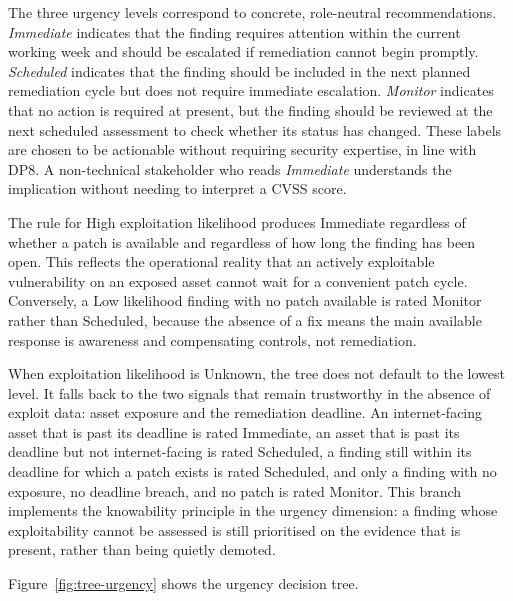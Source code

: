 The three urgency levels correspond to concrete, role-neutral recommendations. \textit{Immediate} indicates that the finding requires attention within the current working week and should be escalated if remediation cannot begin promptly. \textit{Scheduled} indicates that the finding should be included in the next planned remediation cycle but does not require immediate escalation. \textit{Monitor} indicates that no action is required at present, but the finding should be reviewed at the next scheduled assessment to check whether its status has changed. These labels are chosen to be actionable without requiring security expertise, in line with DP8. A non-technical stakeholder who reads \textit{Immediate} understands the implication without needing to interpret a CVSS score.

The rule for High exploitation likelihood produces Immediate regardless of whether a patch is available and regardless of how long the finding has been open. This reflects the operational reality that an actively exploitable vulnerability on an exposed asset cannot wait for a convenient patch cycle. Conversely, a Low likelihood finding with no patch available is rated Monitor rather than Scheduled, because the absence of a fix means the main available response is awareness and compensating controls, not remediation.

When exploitation likelihood is Unknown, the tree does not default to the lowest level. It falls back to the two signals that remain trustworthy in the absence of exploit data: asset exposure and the remediation deadline. An internet-facing asset that is past its deadline is rated Immediate, an asset that is past its deadline but not internet-facing is rated Scheduled, a finding still within its deadline for which a patch exists is rated Scheduled, and only a finding with no exposure, no deadline breach, and no patch is rated Monitor. This branch implements the knowability principle in the urgency dimension: a finding whose exploitability cannot be assessed is still prioritised on the evidence that is present, rather than being quietly demoted.

Figure~\ref{fig:tree-urgency} shows the urgency decision tree.

